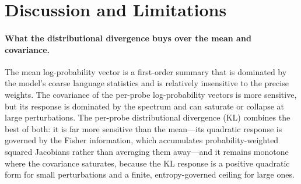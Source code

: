 \documentclass[11pt]{article}
\theoremstyle{definition}
\begin{document}
\section{Discussion and Limitations}
\label{sec:disc}

\paragraph{What the distributional divergence buys over the mean and covariance.}
The mean log-probability vector is a first-order summary that is dominated by
the model's coarse language statistics and is relatively insensitive to the
precise weights. The covariance of the per-probe log-probability vectors is
more sensitive, but its response is dominated by the spectrum and can saturate
or collapse at large perturbations. The per-probe distributional divergence
(KL) combines the best of both: it is far more sensitive than the mean---its
quadratic response is governed by the Fisher information, which accumulates
probability-weighted squared Jacobians rather than averaging them away---and it
remains monotone where the covariance saturates, because the KL response is a
positive quadratic form for small perturbations and a finite, entropy-governed
ceiling for large ones.
\end{document}
